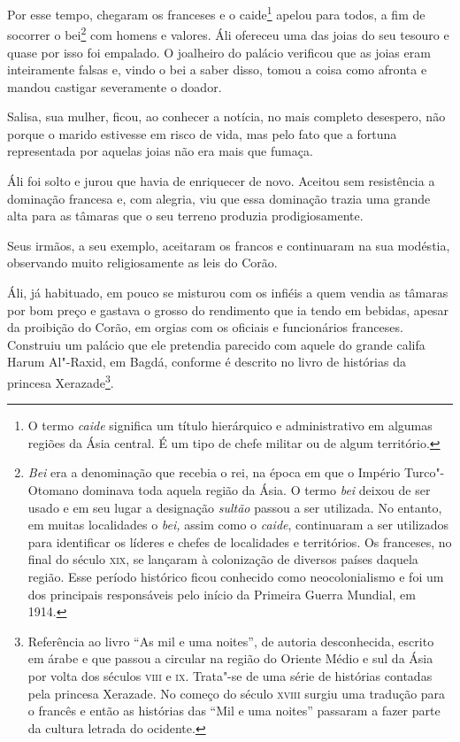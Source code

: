 Por esse tempo, chegaram os franceses e o caide\footnote{O termo
  \emph{caide} significa um título hierárquico e administrativo em
  algumas regiões da Ásia central. É um tipo de chefe militar ou de
  algum território.} apelou para todos, a fim de socorrer o
bei\footnote{\emph{Bei} era a denominação que recebia o rei, na época em
  que o Império Turco"-Otomano dominava toda aquela região da Ásia. O
  termo \emph{bei} deixou de ser usado e em seu lugar a designação
  \emph{sultão} passou a ser utilizada. No entanto, em muitas
  localidades o \emph{bei,} assim como o \emph{caide}, continuaram a ser
  utilizados para identificar os líderes e chefes de localidades e
  territórios. Os franceses, no final do século \textsc{xix}, se lançaram à
  colonização de diversos países daquela região. Esse período histórico
  ficou conhecido como neocolonialismo e foi um dos principais
  responsáveis pelo início da Primeira Guerra Mundial, em 1914.} com
homens e valores. Áli ofereceu uma das joias do seu tesouro e quase por
isso foi empalado. O joalheiro do palácio verificou que as joias eram
inteiramente falsas e, vindo o bei a saber disso, tomou a coisa como
afronta e mandou castigar severamente o doador.

Salisa, sua mulher, ficou, ao conhecer a notícia, no mais completo
desespero, não porque o marido estivesse em risco de vida, mas pelo fato
que a fortuna representada por aquelas joias não era mais que fumaça.

Áli foi solto e jurou que havia de enriquecer de novo. Aceitou sem
resistência a dominação francesa e, com alegria, viu que essa dominação
trazia uma grande alta para as tâmaras que o seu terreno produzia
prodigiosamente.

Seus irmãos, a seu exemplo, aceitaram os francos e continuaram na sua
modéstia, observando muito religiosamente as leis do Corão.

Áli, já habituado, em pouco se misturou com os infiéis a quem vendia as
tâmaras por bom preço e gastava o grosso do rendimento que ia tendo em
bebidas, apesar da proibição do Corão, em orgias com os oficiais e
funcionários franceses. Construiu um palácio que ele pretendia parecido
com aquele do grande califa Harum Al"-Raxid, em Bagdá, conforme é
descrito no livro de histórias da princesa Xerazade\footnote{Referência
  ao livro ``As mil e uma noites'', de autoria desconhecida, escrito em
  árabe e que passou a circular na região do Oriente Médio e sul da Ásia
  por volta dos séculos \textsc{viii} e \textsc{ix}. Trata"-se de uma série de histórias
  contadas pela princesa Xerazade. No começo do século \textsc{xviii} surgiu uma
  tradução para o francês e então as histórias das ``Mil e uma noites''
  passaram a fazer parte da cultura letrada do ocidente.}.

